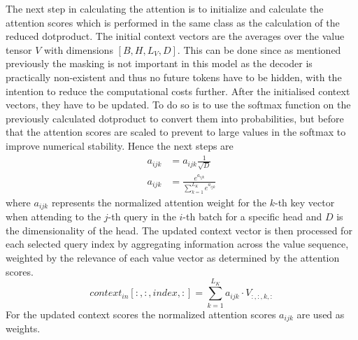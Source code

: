 \documentclass{article}
\begin{document}
The next step in calculating the attention is to initialize and calculate the attention scores which is performed in the same class as the calculation of the reduced dotproduct. The initial context vectors are the averages over the value tensor $V$ with dimensions $[B,H,L_V,D]$. This can be done since as mentioned previously the masking is not important in this model as the decoder is practically non-existent and thus no future tokens have to be hidden, with the intention to reduce the computational costs further. After the initialised context vectors, they have to be updated. To do so is to use the softmax function on the previously calculated dotproduct to convert them into probabilities, but before that the attention scores are scaled to prevent to large values in the softmax to improve numerical stability. Hence the next steps are
\begin{align}
    a_{ijk} &= a_{ijk} \frac{1}{\sqrt{D}} \\
    a_{ijk} &= \frac{e^{a_{ijk}}}{\sum^{L_K}_{k=1}e^{a_{ijk}}}
\end{align}
where $a_{ijk}$ represents the normalized attention weight for the $k$-th key vector when attending to the $j$-th query in the $i$-th batch for a specific head and $D$ is the dimensionality of the head. The updated context vector is then processed for each selected query index by aggregating information across the value sequence, weighted by the relevance of each value vector as determined by the attention scores.
\begin{equation}
    context_{in}[:,:,index,:] = \sum^{L_K}_{k=1} a_{ijk} \cdot V_{:,:,k,:}
\end{equation}
For the updated context scores the normalized attention scores $a_{ijk}$ are used as weights. \par 
\end{document}

